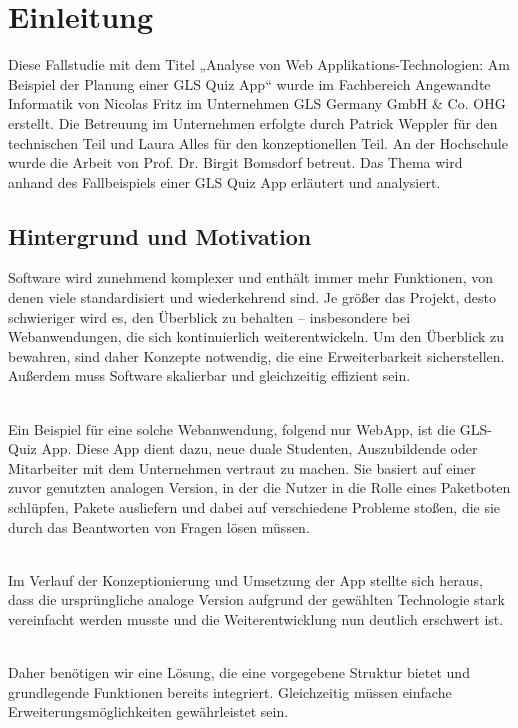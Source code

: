 \documentclass[biblatex]{lni}
\begin{document}
\section{Einleitung}
Diese Fallstudie mit dem Titel „Analyse von Web Applikations-Technologien: Am Beispiel der Planung einer GLS Quiz App“
wurde im Fachbereich Angewandte Informatik von Nicolas Fritz im Unternehmen GLS Germany GmbH & Co. OHG erstellt.
Die Betreuung im Unternehmen erfolgte durch Patrick Weppler für den technischen Teil und Laura Alles für den konzeptionellen Teil.
An der Hochschule wurde die Arbeit von Prof. Dr. Birgit Bomsdorf betreut.
Das Thema wird anhand des Fallbeispiels einer GLS Quiz App erläutert und analysiert.

\subsection{Hintergrund und Motivation}
Software wird zunehmend komplexer und enthält immer mehr Funktionen, von denen viele standardisiert und wiederkehrend sind.
Je größer das Projekt, desto schwieriger wird es, den Überblick zu behalten – insbesondere bei Webanwendungen,
die sich kontinuierlich weiterentwickeln.
Um den Überblick zu bewahren, sind daher Konzepte notwendig, die eine Erweiterbarkeit sicherstellen.
Außerdem muss Software skalierbar und gleichzeitig effizient sein.

\\

Ein Beispiel für eine solche Webanwendung, folgend nur WebApp, ist die GLS-Quiz App.
Diese App dient dazu, neue duale Studenten, Auszubildende oder Mitarbeiter mit dem Unternehmen vertraut zu machen.
Sie basiert auf einer zuvor genutzten analogen Version, in der die Nutzer in die Rolle eines Paketboten schlüpfen,
Pakete ausliefern und dabei auf verschiedene Probleme stoßen, die sie durch das Beantworten von Fragen lösen müssen.

\\

Im Verlauf der Konzeptionierung und Umsetzung der App stellte sich heraus,
dass die ursprüngliche analoge Version aufgrund der gewählten Technologie stark vereinfacht werden musste
und die Weiterentwicklung nun deutlich erschwert ist.

\\

Daher benötigen wir eine Lösung,
die eine vorgegebene Struktur bietet und grundlegende Funktionen bereits integriert.
Gleichzeitig müssen einfache Erweiterungsmöglichkeiten gewährleistet sein.
\end{document}
